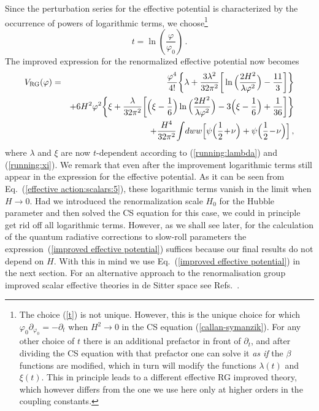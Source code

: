 \documentclass[aps,12pt,superscriptaddress,preprintnumbers,
                secnumarabic,nofootinbib,showpacs]{revtex4}
\begin{document}
Since the perturbation series for the effective potential is
characterized by the occurrence of powers of logarithmic terms, we
choose\footnote{The choice (\ref{t}) is not unique. However, this
is the unique choice for which $\varphi_0\partial_{\varphi_0} =
-\partial_t$ when $H^2 \rightarrow 0$ in the CS equation
(\ref{callan-symanzik}). For any other choice of $t$ there is an
additional prefactor in front of $\partial_t$, and after dividing
the CS equation with that prefactor one can solve it \textit{as if}
the $\beta$ functions are modified, which in turn will modify the
functions $\lambda(t)$ and $\xi(t)$. This in principle leads to a
different effective RG improved theory, which however differs from
the one we use here only at higher orders in the coupling constants.}
\begin{equation}
t = \ln\left(\frac{\varphi}{\varphi_{0}}\right)\,.\label{t}
\end{equation}
The improved expression for the renormalized effective potential
now becomes
\begin{eqnarray}
V_{\mathrm{RG}}(\varphi)
&=&\frac{\varphi^4}{4!}\bigg\{\lambda+\frac{3\lambda^{2}}{32\pi^{2}}
      \bigg[\ln\Big(\frac{2H^{2}}{\lambda\varphi^{2}}\Big)-\frac{11}{3}\bigg]\bigg\}
\nonumber\\
  & &    + 6H^2\varphi^2\bigg\{\xi+\frac{\lambda}{32\pi^{2}}\bigg[\Big(\xi-\frac{1}{6}\Big)
                       \ln\Big(\frac{2H^{2}}{\lambda\varphi^{2}}\Big)
                       -3\Big(\xi-\frac{1}{6}\Big)+\frac{1}{36}\bigg]\bigg\}
\label{improved effective potential}
\\
&&\hskip 0.cm
     +\frac{H^4}{32\pi^2}
        \!\int\! dww
              \Big[\psi\Big(\frac{1}{2}\!+\!\nu\Big)
                              + \psi\Big(\frac{1}{2}\!-\!\nu\Big)\Big]
\nonumber
\,,
\end{eqnarray}
where $\lambda$ and $\xi$ are now $t$-dependent according to
(\ref{running:lambda}) and (\ref{running:xi}). We remark that even
after the improvement logarithmic terms still appear in the
expression for the effective potential. As it can be seen
from Eq.~(\ref{effective action:scalars:5}),
these logarithmic terms vanish in the limit when $H\rightarrow 0$.
Had we introduced the renormalization scale $H_0$ for the Hubble parameter
and then solved the CS equation for this case, we
could in principle get rid off all logarithmic terms.
However, as we shall see later, for the calculation
of the quantum radiative corrections to slow-roll parameters the
expression~(\ref{improved effective potential}) suffices
because our final results do not depend on $H$.
With this in mind we use 
Eq.~(\ref{improved effective potential}) in the next section.
For an alternative approach to the renormalisation group improved scalar
 effective theories in de Sitter space see 
Refs.~\cite{Elizalde:1993qh,Elizalde:1994ds}. 
\end{document}

